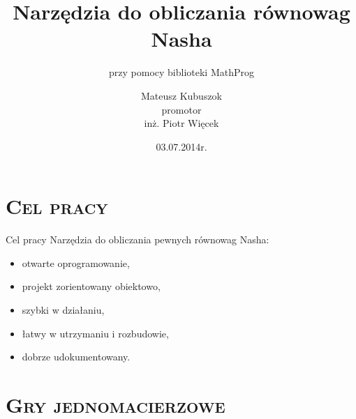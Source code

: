 \documentclass[xcolor=x11names,compress]{beamer}
\renewcommand{\(}{\begin{columns}}
\renewcommand{\)}{\end{columns}}
\newcommand{\<}[1]{\begin{column}{#1}}
\renewcommand{\>}{\end{column}}
\begin{document}
\begin{frame}
\title{Narzędzia do obliczania równowag Nasha}
\subtitle{przy pomocy biblioteki MathProg}
\author[M. Kubuszok]{
  Mateusz Kubuszok\\
  \bigskip
  \tiny{promotor}\\
  \scriptsize{inż. Piotr Więcek}\\
}
\date[Lipiec 2014]{\tiny{03.07.2014r.}}
\titlepage
\end{frame}


\section{\scshape Cel pracy}
\begin{frame}{Cel pracy}
Narzędzia do obliczania pewnych równowag Nasha:
\begin{itemize}
\item otwarte oprogramowanie,
\item projekt zorientowany obiektowo,
\item szybki w działaniu,
\item łatwy w utrzymaniu i rozbudowie,
\item dobrze udokumentowany.
\end{itemize}
\end{frame}


\section{\scshape Gry jednomacierzowe}
\end{document}
